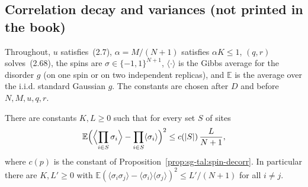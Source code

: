 \subsection{Correlation decay and variances (not printed in the book)}

Throughout, $u$ satisfies~(2.7), $\alpha=M/(N+1)$ satisfies $\alpha K\le1$, $(q,r)$ solves~(2.68), the spins are
$\sigma\in\{-1,1\}^{N+1}$, $\langle\cdot\rangle$ is the Gibbs average for the disorder $g$ (on one spin or on two
independent replicas), and $\mathbb E$ is the average over the i.i.d. standard Gaussian $g$. The constants are
chosen after $D$ and before $N,M,u,q,r$.

\begin{theorem}\label{thm:sg-tal:perceptron-pair-covariance}
  \leanok
There are constants $K,L\ge0$ such that for every set $S$ of sites
\[
 \mathbb E\Bigl(\Bigl\langle\prod_{i\in S}\sigma_i\Bigr\rangle-\prod_{i\in S}\langle\sigma_i\rangle\Bigr)^2
 \le c(|S|)\,\frac{L}{N+1},
\]
where $c(p)$ is the constant of Proposition~\ref{prop:sg-tal:spin-decorr}. In particular there are $K,L'\ge0$ with
$\mathbb E(\langle\sigma_i\sigma_j\rangle-\langle\sigma_i\rangle\langle\sigma_j\rangle)^2\le L'/(N+1)$ for all $i\ne j$.
\end{theorem}
